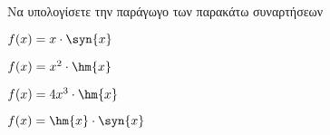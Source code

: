 Να υπολογίσετε την παράγωγο των παρακάτω συναρτήσεων
\begin{alist}
\item $ f(x)=x\cdot\syn{x} $
\item $ f(x)=x^2\cdot\hm{x} $
\item $ f(x)=4x^3\cdot\hm{x} $
\item $ f(x)=\hm{x}\cdot\syn{x} $
\end{alist}

